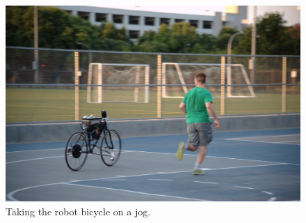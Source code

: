 \begin{figure}[htbp]
  \centering
  \includegraphics[width=\textwidth]{images/balancing.jpg}
  \caption{Taking the robot bicycle on a jog.}
  \label{rb:img:balancing}
\end{figure}
